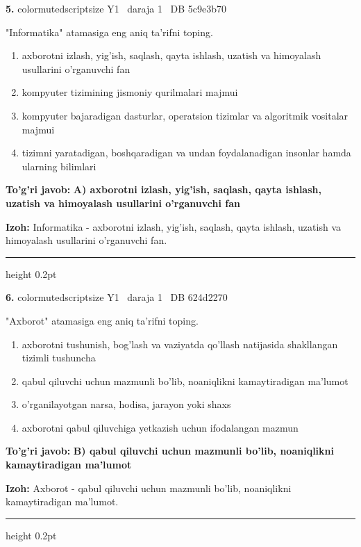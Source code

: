 \documentclass[10pt,a4paper,oneside]{article}
\begin{document}
\noindent\textbf{\color{ink}5.}  {color{muted}scriptsize Y1 \textbullet\ daraja 1 \textbullet\ DB 5c9e3b70}
\par
"Informatika" atamasiga eng aniq ta'rifni toping.
\begin{enumerate}[label=\Alph*),leftmargin=9mm]
\item axborotni izlash, yig'ish, saqlash, qayta ishlash, uzatish va himoyalash usullarini o'rganuvchi fan
\item kompyuter tizimining jismoniy qurilmalari majmui
\item kompyuter bajaradigan dasturlar, operatsion tizimlar va algoritmik vositalar majmui
\item tizimni yaratadigan, boshqaradigan va undan foydalanadigan insonlar hamda ularning bilimlari
\end{enumerate}
\begin{tcolorbox}[enhanced,breakable,colback=teal!4,colframe=teal!50!black,boxrule=0.5pt,arc=1.1mm,left=3mm,right=3mm,top=1.7mm,bottom=1.7mm,before skip=2mm,after skip=2mm]
\textbf{\color{teal}To'g'ri javob:} \textbf{A) axborotni izlash, yig'ish, saqlash, qayta ishlash, uzatish va himoyalash usullarini o'rganuvchi fan}
\par\smallskip
\textbf{Izoh:} Informatika - axborotni izlash, yig'ish, saqlash, qayta ishlash, uzatish va himoyalash usullarini o'rganuvchi fan.
\end{tcolorbox}
\vspace{2mm}\hrule height 0.2pt \vspace{3mm}

\noindent\textbf{\color{ink}6.}  {color{muted}scriptsize Y1 \textbullet\ daraja 1 \textbullet\ DB 624d2270}
\par
"Axborot" atamasiga eng aniq ta'rifni toping.
\begin{enumerate}[label=\Alph*),leftmargin=9mm]
\item axborotni tushunish, bog'lash va vaziyatda qo'llash natijasida shakllangan tizimli tushuncha
\item qabul qiluvchi uchun mazmunli bo'lib, noaniqlikni kamaytiradigan ma'lumot
\item o'rganilayotgan narsa, hodisa, jarayon yoki shaxs
\item axborotni qabul qiluvchiga yetkazish uchun ifodalangan mazmun
\end{enumerate}
\begin{tcolorbox}[enhanced,breakable,colback=teal!4,colframe=teal!50!black,boxrule=0.5pt,arc=1.1mm,left=3mm,right=3mm,top=1.7mm,bottom=1.7mm,before skip=2mm,after skip=2mm]
\textbf{\color{teal}To'g'ri javob:} \textbf{B) qabul qiluvchi uchun mazmunli bo'lib, noaniqlikni kamaytiradigan ma'lumot}
\par\smallskip
\textbf{Izoh:} Axborot - qabul qiluvchi uchun mazmunli bo'lib, noaniqlikni kamaytiradigan ma'lumot.
\end{tcolorbox}
\vspace{2mm}\hrule height 0.2pt \vspace{3mm}
\end{document}
